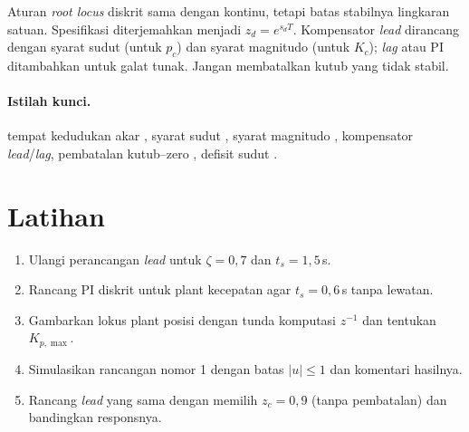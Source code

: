\begin{ringkasan}
	Aturan \textit{root locus} diskrit sama dengan kontinu, tetapi batas stabilnya lingkaran satuan. Spesifikasi diterjemahkan menjadi $z_d = e^{s_dT}$. Kompensator \textit{lead} dirancang dengan syarat sudut (untuk $p_c$) dan syarat magnitudo (untuk $K_c$); \textit{lag} atau PI ditambahkan untuk galat tunak. Jangan membatalkan kutub yang tidak stabil.\\[3pt]
\end{ringkasan}

\paragraph{Istilah kunci.} tempat kedudukan akar , syarat sudut , syarat magnitudo , kompensator \textit{lead}/\textit{lag}, pembatalan kutub--zero , defisit sudut .

\section*{Latihan}
\begin{enumerate}
	\item Ulangi perancangan \textit{lead} untuk $\zeta = 0{,}7$ dan $t_s = 1{,}5$\,s.
	\item Rancang PI diskrit untuk plant kecepatan agar $t_s = 0{,}6$\,s tanpa lewatan.
	\item Gambarkan lokus plant posisi dengan tunda komputasi $z^{-1}$ dan tentukan $K_{p,\max}$.
	\item Simulasikan rancangan nomor 1 dengan batas $|u| \le 1$ dan komentari hasilnya.
	\item Rancang \textit{lead} yang sama dengan memilih $z_c = 0{,}9$ (tanpa pembatalan) dan bandingkan responsnya.
\end{enumerate}
